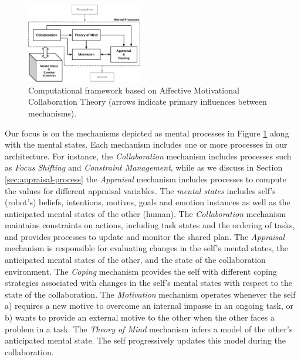 \documentclass{sig-alternate-05-2015}
\begin{document}
\begin{figure}[tbh]
  \centering
  \includegraphics[width=0.45\textwidth]{figure/theory-general-croped.pdf}
  \caption{{\fontsize{9}{9}\selectfont Computational framework based on
  Affective Motivational Collaboration Theory (arrows indicate primary
  influences between mechanisms).}}
  \label{fig:cpm}
\end{figure}

Our focus is on the mechanisms depicted as mental processes in Figure
\ref{fig:cpm} along with the mental states. Each mechanism includes one or
more processes in our architecture. For instance, the \textit{Collaboration}
mechanism includes processes such as \textit{Focus Shifting} and
\textit{Constraint Management}, while as we discuss in Section
\ref{sec:appraisal-process} the \textit{Appraisal} mechanism includes processes
to compute the values for different appraisal variables. The \textit{mental
states} includes self's (robot's) beliefs, intentions, motives, goals and
emotion instances as well as the anticipated mental states of the other (human).
The \textit{Collaboration} mechanism maintains constraints on actions, including
task states and the ordering of tasks, and provides processes to update and
monitor the shared plan. The \textit{Appraisal} mechanism is responsible for
evaluating changes in the self's mental states, the anticipated mental states of
the other, and the state of the collaboration environment. The \textit{Coping}
mechanism provides the self with different coping strategies associated with
changes in the self's mental states with respect to the state of the
collaboration. The \textit{Motivation} mechanism operates whenever the self a)
requires a new motive to overcome an internal impasse in an ongoing task, or b)
wants to provide an external motive to the other when the other faces a problem
in a task. The \textit{Theory of Mind} mechanism infers a model of the other's
anticipated mental state. The self progressively updates this model during the
collaboration.
\end{document}
